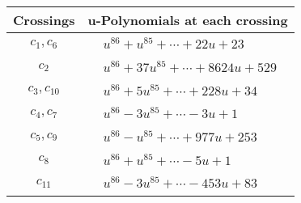 \documentclass[1p]{elsarticle_modified}
\theoremstyle{definition}
\begin{document}
\begin{tabular}{m{50pt}|m{274pt}}
Crossings & \hspace{64pt}u-Polynomials at each crossing \\
\hline $$\begin{aligned}c_{1},c_{6}\end{aligned}$$&$\begin{aligned}
&u^{86}+u^{85}+\cdots+22 u+23
\end{aligned}$\\
\hline $$\begin{aligned}c_{2}\end{aligned}$$&$\begin{aligned}
&u^{86}+37 u^{85}+\cdots+8624 u+529
\end{aligned}$\\
\hline $$\begin{aligned}c_{3},c_{10}\end{aligned}$$&$\begin{aligned}
&u^{86}+5 u^{85}+\cdots+228 u+34
\end{aligned}$\\
\hline $$\begin{aligned}c_{4},c_{7}\end{aligned}$$&$\begin{aligned}
&u^{86}-3 u^{85}+\cdots-3 u+1
\end{aligned}$\\
\hline $$\begin{aligned}c_{5},c_{9}\end{aligned}$$&$\begin{aligned}
&u^{86}- u^{85}+\cdots+977 u+253
\end{aligned}$\\
\hline $$\begin{aligned}c_{8}\end{aligned}$$&$\begin{aligned}
&u^{86}+u^{85}+\cdots-5 u+1
\end{aligned}$\\
\hline $$\begin{aligned}c_{11}\end{aligned}$$&$\begin{aligned}
&u^{86}-3 u^{85}+\cdots-453 u+83
\end{aligned}$\\
\hline
\end{tabular}\\~\\
\newpage\renewcommand{\arraystretch}{1}
\end{document}
